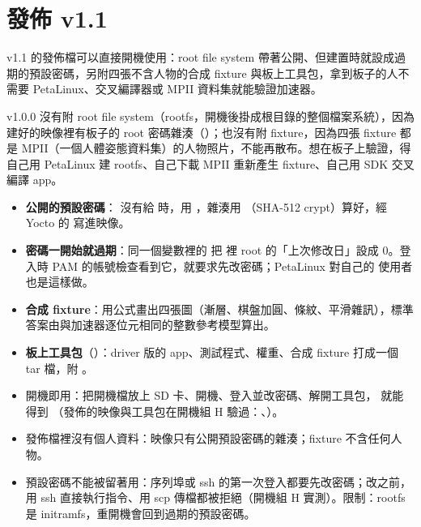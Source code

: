 \section{發佈 v1.1}
\label{sec:release}

\begin{oneline}
v1.1 的發佈檔可以直接開機使用：root file system 帶著公開、但建置時就設成過期的預設密碼，另附四張不含人物的合成 fixture 與板上工具包，拿到板子的人不需要 PetaLinux、交叉編譯器或 MPII 資料集就能驗證加速器。
\end{oneline}

\begin{before}
v1.0.0 沒有附 root file system（rootfs，開機後掛成根目錄的整個檔案系統），因為建好的映像裡有板子的 root 密碼雜湊（）；也沒有附 fixture，因為四張 fixture 都是 MPII（一個人體姿態資料集）的人物照片，不能再散布。想在板子上驗證，得自己用 PetaLinux 建 rootfs、自己下載 MPII 重新產生 fixture、自己用 SDK 交叉編譯 app。
\end{before}

\begin{tech}
\begin{itemize}
\item \textbf{公開的預設密碼}： 沒有給  時，用 ，雜湊用 （SHA-512 crypt）算好，經 Yocto 的  寫進映像。
\item \textbf{密碼一開始就過期}：同一個變數裡的  把  裡 root 的「上次修改日」設成 0。登入時 PAM 的帳號檢查看到它，就要求先改密碼；PetaLinux 對自己的  使用者也是這樣做。
\item \textbf{合成 fixture}：用公式畫出四張圖（漸層、棋盤加圓、條紋、平滑雜訊），標準答案由與加速器逐位元相同的整數參考模型算出。
\item \textbf{板上工具包}（）：driver 版的 app、測試程式、權重、合成 fixture 打成一個 tar 檔，附 。
\end{itemize}
\end{tech}

\begin{gain}
\begin{itemize}
\item 開機即用：把開機檔放上 SD 卡、開機、登入並改密碼、解開工具包， 就能得到 （發佈的映像與工具包在開機組 H 驗過：、）。
\item 發佈檔裡沒有個人資料：映像只有公開預設密碼的雜湊；fixture 不含任何人物。
\item 預設密碼不能被留著用：序列埠或 ssh 的第一次登入都要先改密碼；改之前，用 ssh 直接執行指令、用 scp 傳檔都被拒絕（開機組 H 實測）。限制：rootfs 是 initramfs，重開機會回到過期的預設密碼。
\end{itemize}
\end{gain}

